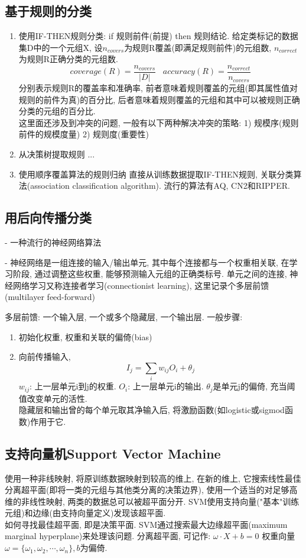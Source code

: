 \documentclass[a4paper,10pt,english]{article}
\begin{document}
\subsection{基于规则的分类}
\begin{enumerate}
\item {使用IF-THEN规则分类: }
if 规则前件(前提) then 规则结论. 给定类标记的数据集D中的一个元组X, 设$n_{covers}$为规则R覆盖(即满足规则前件)的元组数, $n_{correct}$为规则R正确分类的元组数.
$$ coverage(R) = \frac{n_{covers}}{\lvert D \rvert} \;\;\; accuracy(R) = \frac{n_{correct}}{n_{covers}}$$
分别表示规则R的覆盖率和准确率, 前者意味着规则覆盖的元组(即其属性值对规则的前件为真)的百分比, 后者意味着规则覆盖的元组和其中可以被规则正确分类的元组的百分比. \\
这里面还涉及到冲突的问题, 一般有以下两种解决冲突的策略: 1) 规模序(规则前件的规模度量) 2) 规则度(重要性)
\item {从决策树提取规则}
...
\item {使用顺序覆盖算法的规则归纳}
直接从训练数据提取IF-THEN规则, 关联分类算法(association classification algorithm).
流行的算法有AQ, CN2和RIPPER.
\end{enumerate}


\subsection{用后向传播分类}
\begin{description}
\item{-}
\small{
一种流行的神经网络算法
}
\item {-}
\small{
神经网络是一组连接的输入/输出单元, 其中每个连接都与一个权重相关联, 在学习阶段, 通过调整这些权重, 能够预测输入元组的正确类标号. 单元之间的连接, 神经网络学习又称连接者学习(connectionist learning), 这里记录个多层前馈(multilayer feed-forward)
}
\end{description}
多层前馈: 一个输入层, 一个或多个隐藏层, 一个输出层. 一般步骤:
\begin{enumerate}
\item 
初始化权重, 权重和关联的偏倚(bias)
\item
向前传播输入, 
$$ I_j = \sum_iw_{ij}O_i + \theta_j $$ $w_{ij}$: 上一层单元i到j的权重. $O_i$: 上一层单元i的输出. $\theta_j$是单元j的偏倚, 充当阈值改变单元的活性.\\
隐藏层和输出曾的每个单元取其净输入后, 将激励函数(如logistic或sigmod函数)作用于它.
\end{enumerate}

\subsection {支持向量机Support Vector Machine}
使用一种非线映射, 将原训练数据映射到较高的维上, 在新的维上, 它搜索线性最佳分离超平面(即将一类的元组与其他类分离的决策边界), 使用一个适当的对足够高维的非线性映射, 两类的数据总可以被超平面分开. SVM使用支持向量("基本"训练元组)和边缘(由支持向量定义)发现该超平面. \\
如何寻找最佳超平面, 即是决策平面. SVM通过搜索最大边缘超平面(maximum marginal hyperplane)来处理该问题. 
分离超平面, 可记作: $ \omega \cdot X + b = 0$ 权重向量$\omega = \{\omega_1, \omega_2, \cdots, \omega_n\}, b$为偏倚.
\end{document}
